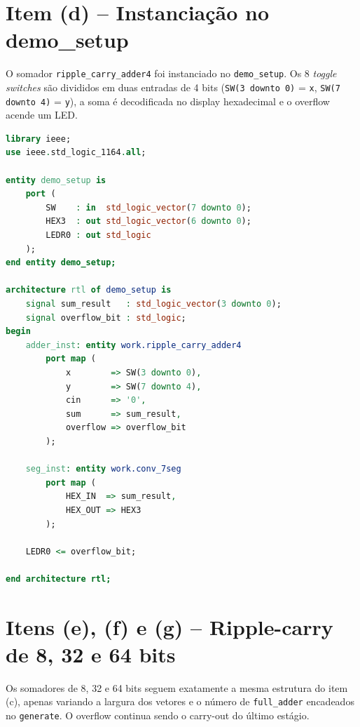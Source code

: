 \documentclass[report, 12pt]{uftreport}
\begin{document}
\section{Item (d) -- Instanciação no demo\_setup}

O somador \texttt{ripple\_carry\_adder4} foi instanciado no \texttt{demo\_setup}. Os 8 \textit{toggle switches} são divididos em duas entradas de 4 bits (\texttt{SW(3 downto 0)} = \texttt{x}, \texttt{SW(7 downto 4)} = \texttt{y}), a soma é decodificada no display hexadecimal e o overflow acende um LED.

\begin{lstlisting}[language=VHDL]
library ieee;
use ieee.std_logic_1164.all;

entity demo_setup is
    port (
        SW    : in  std_logic_vector(7 downto 0);
        HEX3  : out std_logic_vector(6 downto 0);
        LEDR0 : out std_logic
    );
end entity demo_setup;

architecture rtl of demo_setup is
    signal sum_result   : std_logic_vector(3 downto 0);
    signal overflow_bit : std_logic;
begin
    adder_inst: entity work.ripple_carry_adder4
        port map (
            x        => SW(3 downto 0),
            y        => SW(7 downto 4),
            cin      => '0',
            sum      => sum_result,
            overflow => overflow_bit
        );

    seg_inst: entity work.conv_7seg
        port map (
            HEX_IN  => sum_result,
            HEX_OUT => HEX3
        );

    LEDR0 <= overflow_bit;

end architecture rtl;
\end{lstlisting}

\section{Itens (e), (f) e (g) -- Ripple-carry de 8, 32 e 64 bits}

Os somadores de 8, 32 e 64 bits seguem exatamente a mesma estrutura do item (c), apenas variando a largura dos vetores e o número de \texttt{full\_adder} encadeados no \texttt{generate}. O overflow continua sendo o carry-out do último estágio.
\end{document}

